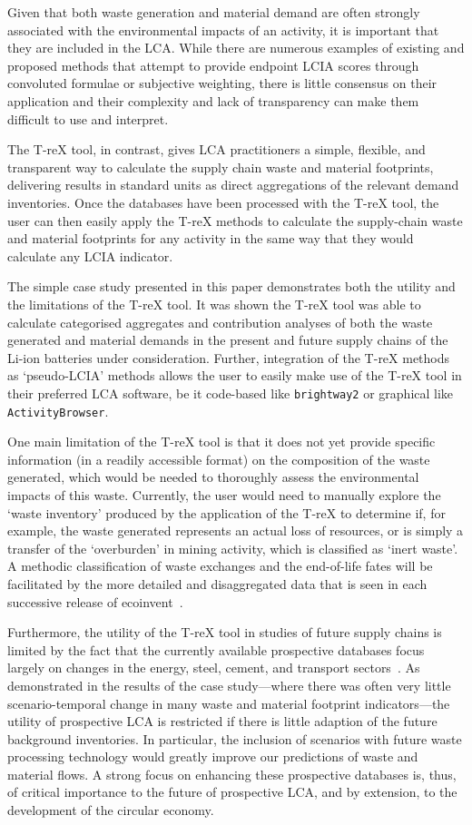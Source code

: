 Given that both waste generation and material demand are often strongly associated with the environmental impacts of an activity, it is important that they are included in the LCA. While there are numerous examples of existing and proposed methods that attempt to provide endpoint LCIA scores through convoluted formulae or subjective weighting, there is little consensus on their application and their complexity and lack of transparency can make them difficult to use and interpret.

The T-reX tool, in contrast, gives LCA practitioners a simple, flexible, and transparent way to calculate the supply chain waste and material footprints, delivering results in standard units as direct aggregations of the relevant demand inventories. Once the databases have been processed with the T-reX tool, the user can then easily apply the T-reX methods to calculate the supply-chain waste and material footprints for any activity in the same way that they would calculate any LCIA indicator.

The simple case study presented in this paper demonstrates both the utility and the limitations of the T-reX tool. It was shown the T-reX tool was able to calculate categorised aggregates and contribution analyses of both the waste generated and material demands in the present and future supply chains of the Li-ion batteries under consideration. Further, integration of the T-reX methods as `pseudo-LCIA' methods allows the user to easily make use of the T-reX tool in their preferred LCA software, be it code-based like \texttt{brightway2} or graphical like \texttt{ActivityBrowser}.

One main limitation of the T-reX tool is that it does not yet provide specific information (in a readily accessible format) on the composition of the waste generated, which would be needed to thoroughly assess the environmental impacts of this waste. Currently, the user would need to manually explore the `waste inventory' produced by the application of the T-reX to determine if, for example, the waste generated represents an actual loss of resources, or is simply a transfer of the `overburden' in mining activity, which is classified as `inert waste'. A methodic classification of waste exchanges and the end-of-life fates will be facilitated by the more detailed and disaggregated data that is seen in each successive release of ecoinvent~\citep{fitzgerald2023ecoinventdocumentation}.

Furthermore, the utility of the T-reX tool in studies of future supply chains is limited by the fact that the currently available prospective databases focus largely on changes in the energy, steel, cement, and transport sectors~\citep{sacchi2023premisedocs}. As demonstrated in the results of the case study---where there was often very little scenario-temporal change in many waste and material footprint indicators---the utility of prospective LCA is restricted if there is little adaption of the future background inventories. In particular, the inclusion of scenarios with future waste processing technology would greatly improve our predictions of waste and material flows. A strong focus on enhancing these prospective databases is, thus, of critical importance to the future of prospective LCA, and by extension, to the development of the circular economy. 
